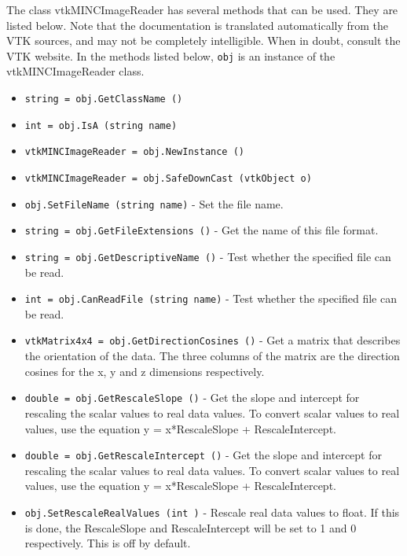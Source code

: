 The class vtkMINCImageReader has several methods that can be used.
  They are listed below.
Note that the documentation is translated automatically from the VTK sources,
and may not be completely intelligible.  When in doubt, consult the VTK website.
In the methods listed below, \verb|obj| is an instance of the vtkMINCImageReader class.
\begin{itemize}
\item  \verb|string = obj.GetClassName ()|

\item  \verb|int = obj.IsA (string name)|

\item  \verb|vtkMINCImageReader = obj.NewInstance ()|

\item  \verb|vtkMINCImageReader = obj.SafeDownCast (vtkObject o)|

\item  \verb|obj.SetFileName (string name)| -  Set the file name.

\item  \verb|string = obj.GetFileExtensions ()| -  Get the name of this file format.

\item  \verb|string = obj.GetDescriptiveName ()| -  Test whether the specified file can be read.

\item  \verb|int = obj.CanReadFile (string name)| -  Test whether the specified file can be read.

\item  \verb|vtkMatrix4x4 = obj.GetDirectionCosines ()| -  Get a matrix that describes the orientation of the data.
 The three columns of the matrix are the direction cosines
 for the x, y and z dimensions respectively.

\item  \verb|double = obj.GetRescaleSlope ()| -  Get the slope and intercept for rescaling the scalar values
 to real data values.  To convert scalar values to real values,
 use the equation y = x*RescaleSlope + RescaleIntercept.

\item  \verb|double = obj.GetRescaleIntercept ()| -  Get the slope and intercept for rescaling the scalar values
 to real data values.  To convert scalar values to real values,
 use the equation y = x*RescaleSlope + RescaleIntercept.

\item  \verb|obj.SetRescaleRealValues (int )| -  Rescale real data values to float.  If this is done, the
 RescaleSlope and RescaleIntercept will be set to 1 and 0
 respectively.  This is off by default.


\end{itemize}
